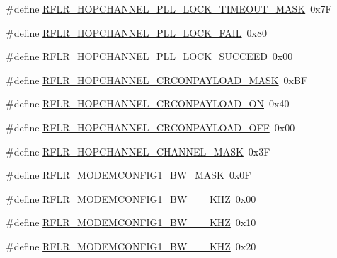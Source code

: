 \begin{DoxyCompactItemize}
\item 
\#define \mbox{\hyperlink{sx1276_regs-_lo_ra_8h_a9b65f0f8d357147986b31a6c668868fb}{R\+F\+L\+R\+\_\+\+H\+O\+P\+C\+H\+A\+N\+N\+E\+L\+\_\+\+P\+L\+L\+\_\+\+L\+O\+C\+K\+\_\+\+T\+I\+M\+E\+O\+U\+T\+\_\+\+M\+A\+SK}}~0x7F
\item 
\#define \mbox{\hyperlink{sx1276_regs-_lo_ra_8h_a5585b4aec7b248eb33ae15ba12b6d91a}{R\+F\+L\+R\+\_\+\+H\+O\+P\+C\+H\+A\+N\+N\+E\+L\+\_\+\+P\+L\+L\+\_\+\+L\+O\+C\+K\+\_\+\+F\+A\+IL}}~0x80
\item 
\#define \mbox{\hyperlink{sx1276_regs-_lo_ra_8h_aee5274333f27229f37276e92627fe9d0}{R\+F\+L\+R\+\_\+\+H\+O\+P\+C\+H\+A\+N\+N\+E\+L\+\_\+\+P\+L\+L\+\_\+\+L\+O\+C\+K\+\_\+\+S\+U\+C\+C\+E\+ED}}~0x00
\item 
\#define \mbox{\hyperlink{sx1276_regs-_lo_ra_8h_aa8fbfece67ad9c1feabed0dc5018d1fa}{R\+F\+L\+R\+\_\+\+H\+O\+P\+C\+H\+A\+N\+N\+E\+L\+\_\+\+C\+R\+C\+O\+N\+P\+A\+Y\+L\+O\+A\+D\+\_\+\+M\+A\+SK}}~0x\+BF
\item 
\#define \mbox{\hyperlink{sx1276_regs-_lo_ra_8h_ab93bd7b9eac440324cb3e24bd123af06}{R\+F\+L\+R\+\_\+\+H\+O\+P\+C\+H\+A\+N\+N\+E\+L\+\_\+\+C\+R\+C\+O\+N\+P\+A\+Y\+L\+O\+A\+D\+\_\+\+ON}}~0x40
\item 
\#define \mbox{\hyperlink{sx1276_regs-_lo_ra_8h_a1355316824e22da44242051ef2e802cd}{R\+F\+L\+R\+\_\+\+H\+O\+P\+C\+H\+A\+N\+N\+E\+L\+\_\+\+C\+R\+C\+O\+N\+P\+A\+Y\+L\+O\+A\+D\+\_\+\+O\+FF}}~0x00
\item 
\#define \mbox{\hyperlink{sx1276_regs-_lo_ra_8h_a8f0d9adf82ac36ad0e801b0ab96439a2}{R\+F\+L\+R\+\_\+\+H\+O\+P\+C\+H\+A\+N\+N\+E\+L\+\_\+\+C\+H\+A\+N\+N\+E\+L\+\_\+\+M\+A\+SK}}~0x3F
\item 
\#define \mbox{\hyperlink{sx1276_regs-_lo_ra_8h_ab1aa24187e882f0f54896b50ccae77d4}{R\+F\+L\+R\+\_\+\+M\+O\+D\+E\+M\+C\+O\+N\+F\+I\+G1\+\_\+\+B\+W\+\_\+\+M\+A\+SK}}~0x0F
\item 
\#define \mbox{\hyperlink{sx1276_regs-_lo_ra_8h_a5588d7dec546c6f6f676ab4f7574604a}{R\+F\+L\+R\+\_\+\+M\+O\+D\+E\+M\+C\+O\+N\+F\+I\+G1\+\_\+\+B\+W\+\_\+\_\+\_\+\+K\+HZ}}~0x00
\item 
\#define \mbox{\hyperlink{sx1276_regs-_lo_ra_8h_acc64eb6597ce1a53b3150ed0e66ed5c1}{R\+F\+L\+R\+\_\+\+M\+O\+D\+E\+M\+C\+O\+N\+F\+I\+G1\+\_\+\+B\+W\+\_\+\_\+\_\+\+K\+HZ}}~0x10
\item 
\#define \mbox{\hyperlink{sx1276_regs-_lo_ra_8h_a302f1d2a8b4689aeb3f09e49d882d953}{R\+F\+L\+R\+\_\+\+M\+O\+D\+E\+M\+C\+O\+N\+F\+I\+G1\+\_\+\+B\+W\+\_\+\_\+\_\+\+K\+HZ}}~0x20
\item 

\end{DoxyCompactItemize}
